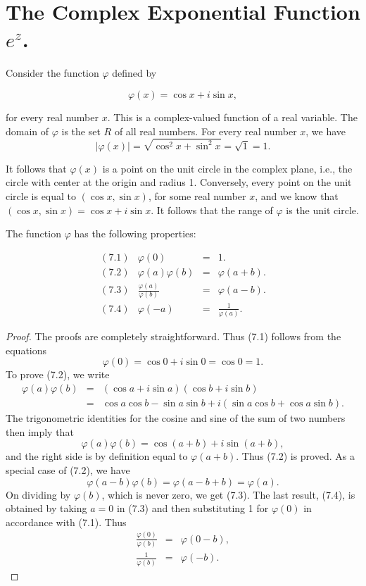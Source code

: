 \section{The Complex Exponential Function $e^{z}$.}
 Consider the function $\varphi$ defined by 

$$
\varphi(x) = \cos x + i \sin x,
$$

\noindent for every real number $x$. This is a complex-valued function of a real variable. 
The domain of $\varphi$ is the set $R$ of all real numbers. For every real number $x$, 
we have
$$
|\varphi(x)| = \sqrt{\cos^{2}x + \sin^{2}x} = \sqrt{1} = 1.
$$

It follows that $\varphi (x)$ is a point on the unit circle in the complex plane, i.e., 
the circle with center at the origin and radius 1. Conversely, every point on the 
unit circle is equal to $(\cos x, \sin x)$, for some real number $x$, and we know that 
$(\cos x, \sin x) = \cos x + i \sin x$. It follows that the range of $\varphi$ is the unit circle. 

The function $\varphi$ has the following properties:
\begin{theorem}
$$
\begin{array}{lrcl}
\mathrm{( 7.1 )}&                             \varphi (0) &=& 1. \\
\mathrm{( 7.2 )}&            \varphi (a) \varphi (b) &=& \varphi (a + b).\\
\mathrm{( 7.3 )}& \frac{\varphi (a)}{\varphi (b)} &=& \varphi (a - b).\\
\mathrm{( 7.4 )}&                            \varphi( -a) &=& \frac{1}{\varphi (a)}.
\end{array}
$$
\end{theorem}


\begin{proof}
The proofs are completely straightforward. Thus (7.1) follows from the equations
$$
\varphi(0) = \cos 0 + i \sin 0 = \cos 0 = 1.
$$
To prove (7.2), we write
\begin{eqnarray*}
\varphi (a) \varphi (b) &=& (\cos a + i \sin a)(\cos b + i \sin b)\\
                                  &=& \cos a \cos b - \sin a \sin b + i(\sin a \cos b + \cos a \sin b).
\end{eqnarray*}
The trigonometric identities for the cosine and sine of the sum of two numbers 
then imply that
$$
 \varphi (a) \varphi (b) = \cos(a + b) + i \sin(a + b), 
$$
and the right side is by definition equal to $\varphi (a + b)$.
Thus (7.2) is proved. As a special case of (7.2), we have
$$
\varphi (a - b) \varphi (b) = \varphi (a - b + b) = \varphi (a).
$$
On dividing by $\varphi(b)$, which is never zero, we get (7.3). The last result, (7.4), 
is obtained by taking $a = 0$ in (7.3) and then substituting 1 for $\varphi (0)$ in accordance with (7.1). Thus
\begin{eqnarray*}
\frac{\varphi (0)}{\varphi (b)} &=& \varphi (0 - b),\\
              \frac{1}{\varphi (b)} &=& \varphi (-b).
\end{eqnarray*}
\end{proof}


